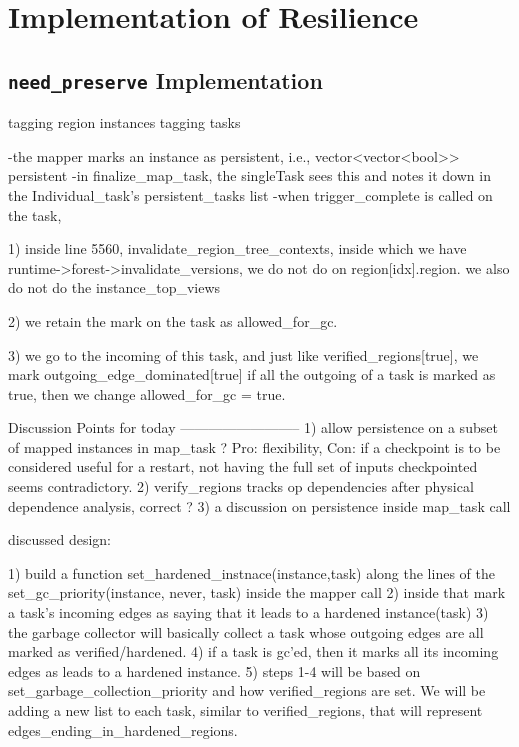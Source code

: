 \section{Implementation of Resilience}

\subsection{\texttt{need\_preserve} Implementation}

tagging region instances
tagging tasks

-the mapper marks an instance as persistent, i.e., vector<vector<bool>> persistent
-in finalize\_map\_task, the singleTask sees this and notes it down in the Individual\_task's persistent\_tasks list
-when trigger\_complete is called on the task, 

	1) inside line 5560, invalidate\_region\_tree\_contexts, 
		inside which we have runtime->forest->invalidate\_versions, we do not do on region[idx].region.
		we also do not do the instance\_top\_views
		
	2) we retain the mark on the task as allowed\_for\_gc.

   3) we go to the incoming of this task, and just like verified\_regions[true], we mark outgoing\_edge\_dominated[true]
      if all the outgoing of a task is marked as true, then we change allowed\_for\_gc = true.


Discussion Points for today
--------------------------
1) allow persistence on a subset of mapped instances in map\_task ? Pro:
flexibility, Con: if a checkpoint is to be considered useful for a restart, not
having the full set of inputs checkpointed seems contradictory. 
2) verify\_regions tracks op dependencies after physical dependence analysis, correct ? 
3) a discussion on persistence inside map\_task call 


discussed design:

1) build a function set\_hardened\_instnace(instance,task) along the lines of the set\_gc\_priority(instance, never, task) inside the mapper call
2) inside that mark a task's incoming edges as saying that it leads to a hardened instance(task)
3) the garbage collector will basically collect a task whose outgoing edges are all marked as verified/hardened.
4) if a task is gc'ed, then it marks all its incoming edges as leads to a hardened instance.
5) steps 1-4 will be based on set\_garbage\_collection\_priority and how verified\_regions are set. We will be adding a new list to each task, similar to verified\_regions, that will represent edges\_ending\_in\_hardened\_regions.


